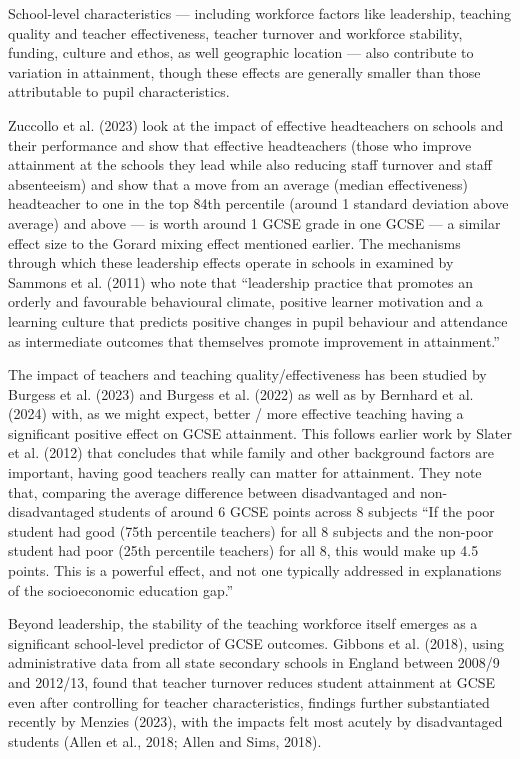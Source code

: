 \documentclass[
  11pt,
]{article}
\begin{document}
School-level characteristics --- including workforce factors like
leadership, teaching quality and teacher effectiveness, teacher turnover
and workforce stability, funding, culture and ethos, as well geographic
location --- also contribute to variation in attainment, though these
effects are generally smaller than those attributable to pupil
characteristics.

Zuccollo et al. (2023) look at the impact of effective headteachers on
schools and their performance and show that effective headteachers
(those who improve attainment at the schools they lead while also
reducing staff turnover and staff absenteeism) and show that a move from
an average (median effectiveness) headteacher to one in the top 84th
percentile (around 1 standard deviation above average) and above --- is
worth around 1 GCSE grade in one GCSE --- a similar effect size to the
Gorard mixing effect mentioned earlier. The mechanisms through which
these leadership effects operate in schools in examined by Sammons et
al. (2011) who note that ``leadership practice that promotes an orderly
and favourable behavioural climate, positive learner motivation and a
learning culture that predicts positive changes in pupil behaviour and
attendance as intermediate outcomes that themselves promote improvement
in attainment.''

The impact of teachers and teaching quality/effectiveness has been
studied by Burgess et al. (2023) and Burgess et al. (2022) as well as by
Bernhard et al. (2024) with, as we might expect, better / more effective
teaching having a significant positive effect on GCSE attainment. This
follows earlier work by Slater et al. (2012) that concludes that while
family and other background factors are important, having good teachers
really can matter for attainment. They note that, comparing the average
difference between disadvantaged and non-disadvantaged students of
around 6 GCSE points across 8 subjects ``If the poor student had good
(75th percentile teachers) for all 8 subjects and the non-poor student
had poor (25th percentile teachers) for all 8, this would make up 4.5
points. This is a powerful effect, and not one typically addressed in
explanations of the socioeconomic education gap.''

Beyond leadership, the stability of the teaching workforce itself
emerges as a significant school-level predictor of GCSE outcomes.
Gibbons et al. (2018), using administrative data from all state
secondary schools in England between 2008/9 and 2012/13, found that
teacher turnover reduces student attainment at GCSE even after
controlling for teacher characteristics, findings further substantiated
recently by Menzies (2023), with the impacts felt most acutely by
disadvantaged students (Allen et al., 2018; Allen and Sims, 2018).
\end{document}
